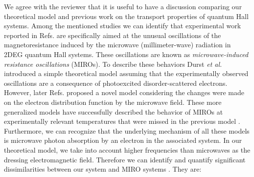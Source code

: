 \documentclass{article}
\begin{document}
We agree with the reviewer that it is useful to have a discussion comparing  our theoretical model and previous work on the transport properties of quantum Hall systems.
Among the mentioned studies we can identify that experimental work reported in Refs. \cite{zudov01,mani02,zudov03,mani04} are specifically aimed at the unusual oscillations of the magnetoresistance induced by the microwave (millimeter-wave) radiation in 2DEG quantum Hall systems.
These oscillations are known as \textit{microwave-induced resistance oscillations} (MIROs).
To describe these behaviors Durst \textit{et al.} \cite{durst03} introduced a simple theoretical model assuming that the experimentally observed oscillations are a consequence of photoexcited disorder-scattered electrons.
However, later Refs. \cite{dmitriev03,dmitriev05,dmitriev09} proposed a novel model considering the changes were made on
the electron distribution function by the microwave field.
These more generalized models \cite{dmitriev03,dmitriev05,dmitriev09} have successfully described the behavior of MIROs at experimentally relevant temperatures that were missed in the previous model \cite{durst03}.
Furthermore, we can recognize that the underlying mechanism of all these models \cite{durst03,dmitriev03,dmitriev05,dmitriev09} is microwave photon absorption by an electron in the associated system. In our theoretical model, we take into account higher frequencies than microwaves as the dressing electromagnetic field.
Therefore we can identify and quantify significant dissimilarities between our system and MIRO systems \cite{zudov01,mani02,zudov03,mani04,durst03,dmitriev03,dmitriev05,dmitriev09}. They are:
\end{document}
